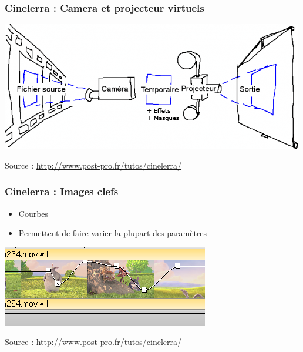 \begin{frame}
 \frametitle{Cinelerra : Camera et projecteur virtuels}
 
  \includegraphics[scale=0.60]{ressources/cinelerra_camera_projecteur.png}
  
  Source : \href{http://www.post-pro.fr/tutos/cinelerra/}{http://www.post-pro.fr/tutos/cinelerra/}
\end{frame}

\begin{frame}
 \frametitle{Cinelerra : Images clefs}
 \begin{itemize}
 \item Courbes
 \item Permettent de faire varier la plupart des paramètres
 \end{itemize}
  \includegraphics[scale=1]{ressources/cinelerra-image-clef.png}
  
  Source : \href{http://www.post-pro.fr/tutos/cinelerra/}{http://www.post-pro.fr/tutos/cinelerra/}
\end{frame}


